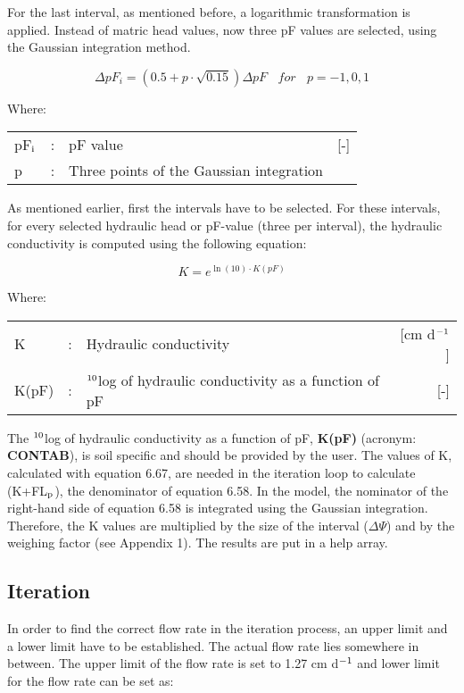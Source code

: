 For the last interval, as mentioned before, a logarithmic transformation is applied. Instead
of matric head values, now three pF values are selected, using the Gaussian integration
method.

\begin{equation}
\Delta pF _{i} = (0.5 + p \cdot \sqrt{0.15})\Delta pF ~~~~ for ~~~~ p = -1, 0, 1
\end{equation}

Where:\\[5pt]
\begin{tabularx}{\textwidth}{llXr}
pF$_{{\rm i}}$ &:& pF value  & [-]\\
p &:& Three points of the Gaussian integration\\
\end{tabularx}

As mentioned earlier, first the intervals have to be selected. For these intervals, for every
selected hydraulic head or pF-value (three per interval), the hydraulic conductivity is
computed using the following equation:

\begin{equation}
K = e^{\ln(10) \cdot K(pF)} 
\end{equation}

Where:\\[5pt]
\begin{tabularx}{\textwidth}{llXr}
K &:& Hydraulic conductivity  & [cm d$^{{\rm -1}}$]\\
K(pF) &:& $^{{\rm 10}}$log of hydraulic conductivity as a function of pF  & [-]\\
\end{tabularx}

The $^{{\rm 10}}$log of hydraulic conductivity as a function of pF, {\bf K(pF)} 
(acronym: {\bf CONTAB}), is soil specific and should be provided by the user.
The values of K, calculated with equation 6.67, are needed in the iteration loop to
calculate (K+FL$_{{\rm p}}$), the denominator of equation 6.58. In the model, the nominator of the
right-hand side of equation 6.58 is integrated using the Gaussian integration. Therefore,
the K values are multiplied by the size of the interval ($\Delta$$\Psi$) and by the weighing factor
(see Appendix 1). The results are put in a help array.

\subsection{Iteration}
In order to find the correct flow rate in the iteration process, an upper limit and a lower
limit have to be established. The actual flow rate lies somewhere in between. The upper
limit of the flow rate is set to 1.27 cm d$^{{\rm -1}}$ and lower limit for the flow rate can be set as:

